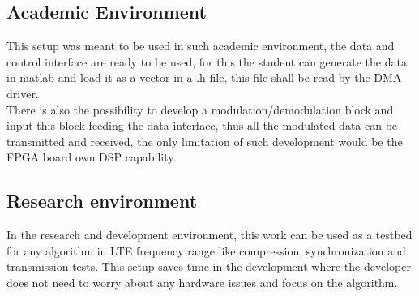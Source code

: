 \subsection{Academic Environment}

This setup was meant to be used in such academic environment, the data and control
interface are ready to be used, for this the student can generate the data in
matlab and load it as a vector in a .h file, this file shall be read by the DMA
driver.\\
There is also the possibility to develop a modulation/demodulation block
and input this block feeding the data interface, thus all the modulated data can
be transmitted and received, the only limitation of such development would be the
FPGA board own DSP capability.

\subsection{Research environment}

In the research and development environment, this work can be used as a testbed
for any algorithm in LTE frequency range like compression, synchronization and
transmission tests. This setup saves time in the development where the developer
does not need to worry about any hardware issues and focus on the algorithm.
